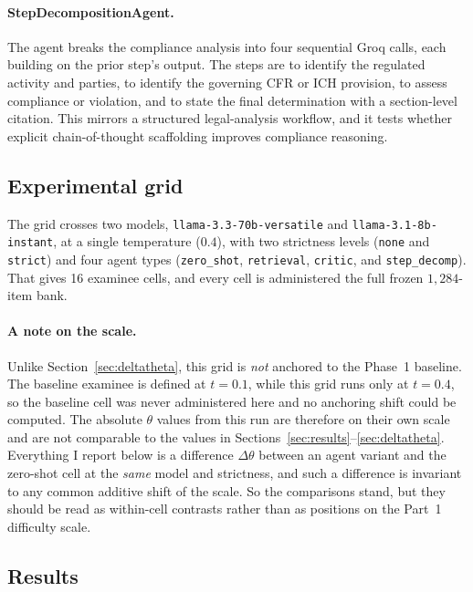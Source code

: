\paragraph{StepDecompositionAgent.}
The agent breaks the compliance analysis into four sequential Groq calls,
each building on the prior step's output. The steps are to identify the
regulated activity and parties, to identify the governing CFR or ICH
provision, to assess compliance or violation, and to state the final
determination with a section-level citation. This mirrors a structured
legal-analysis workflow, and it tests whether explicit chain-of-thought
scaffolding improves compliance reasoning.

\subsection{Experimental grid}
The grid crosses two models, \texttt{llama-3.3-70b-versatile} and
\texttt{llama-3.1-8b-instant}, at a single temperature ($0.4$), with two
strictness levels (\texttt{none} and \texttt{strict}) and four agent
types (\texttt{zero\_shot}, \texttt{retrieval}, \texttt{critic}, and
\texttt{step\_decomp}). That gives 16 examinee cells, and every cell is
administered the full frozen $1{,}284$-item bank.

\paragraph{A note on the scale.}
Unlike Section~\ref{sec:deltatheta}, this grid is \emph{not} anchored to
the Phase~1 baseline. The baseline examinee is defined at $t = 0.1$,
while this grid runs only at $t = 0.4$, so the baseline cell was never
administered here and no anchoring shift could be computed. The absolute
$\theta$ values from this run are therefore on their own scale and are
not comparable to the values in
Sections~\ref{sec:results}--\ref{sec:deltatheta}. Everything I report
below is a difference $\Delta\theta$ between an agent variant and the
zero-shot cell at the \emph{same} model and strictness, and such a
difference is invariant to any common additive shift of the scale. So the
comparisons stand, but they should be read as within-cell contrasts
rather than as positions on the Part~1 difficulty scale.

\subsection{Results}

